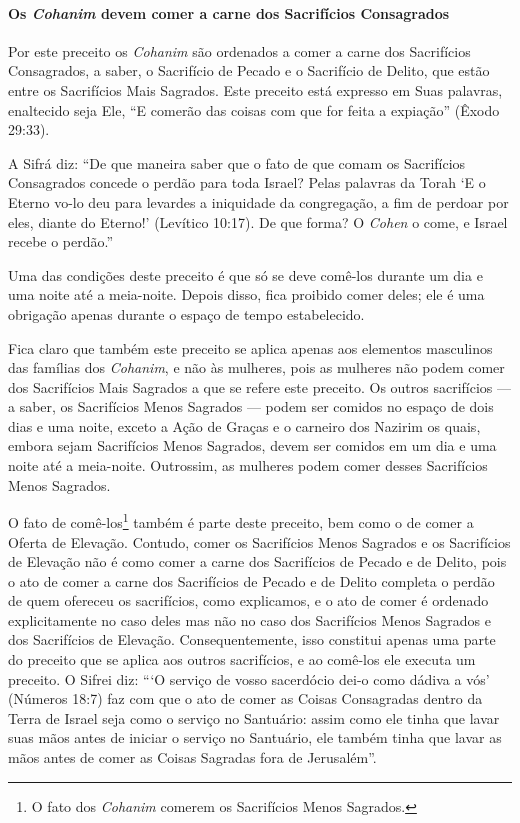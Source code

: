 \paragraph{Os \textit{Cohanim} devem comer a carne dos Sacrifícios Consagrados}

Por este preceito os \textit{Cohanim} são ordenados a comer a carne dos
Sacrifícios Consagrados, a saber, o Sacrifício de Pecado e o Sacrifício
de Delito, que estão entre os Sacrifícios Mais Sagrados. Este preceito
está expresso em Suas palavras, enaltecido seja Ele, ``E comerão das
coisas com que for feita a expiação'' (Êxodo 29:33).

A Sifrá diz: ``De que maneira saber que o fato de que comam os
Sacrifícios Consagrados concede o perdão para toda Israel? Pelas
palavras da Torah `E o Eterno vo-lo deu para levardes a iniquidade da
congregação, a fim de perdoar por eles, diante do Eterno!' (Levítico
10:17). De que forma? O \textit{Cohen} o come, e Israel recebe o perdão.''

Uma das condições deste preceito é que só se deve comê-los durante um
dia e uma noite até a meia-noite. Depois disso, fica proibido comer
deles; ele é uma obrigação apenas durante o espaço de tempo
estabelecido.

Fica claro que também este preceito se aplica apenas aos elementos
masculinos das famílias dos \textit{Cohanim}, e não às mulheres, pois as
mulheres não podem comer dos Sacrifícios Mais Sagrados a que se refere
este preceito. Os outros sacrifícios --- a saber, os Sacrifícios Menos
Sagrados --- podem ser comidos no espaço de dois dias e uma noite,
exceto a Ação de Graças e o carneiro dos Nazirim os quais, embora sejam
Sacrifícios Menos Sagrados, devem ser comidos em um dia e uma noite até
a meia-noite. Outrossim, as mulheres podem comer desses Sacrifícios
Menos Sagrados.

O fato de comê-los\footnote{O fato dos \textit{Cohanim} comerem os Sacrifícios Menos Sagrados.} também é parte deste preceito,
bem como o de comer a Oferta de Elevação. Contudo, comer os Sacrifícios
Menos Sagrados e os Sacrifícios de Elevação não é como comer a carne dos
Sacrifícios de Pecado e de Delito, pois o ato de comer a carne dos
Sacrifícios de Pecado e de Delito completa o perdão de quem ofereceu os
sacrifícios, como explicamos, e o ato de comer é ordenado explicitamente
no caso deles mas não no caso dos Sacrifícios Menos Sagrados e dos Sacrifícios de Elevação.
Consequentemente, isso constitui apenas uma parte do preceito que se
aplica aos outros sacrifícios, e ao comê-los ele executa um preceito. O
Sifrei diz: ```O serviço de vosso sacerdócio dei-o como dádiva a vós'
(Números 18:7) faz com que o ato de comer as Coisas Consagradas dentro
da Terra de Israel seja como o serviço no Santuário: assim como ele
tinha que lavar suas mãos antes de iniciar o serviço no Santuário, ele
também tinha que lavar as mãos antes de comer as Coisas Sagradas fora de
Jerusalém''.

